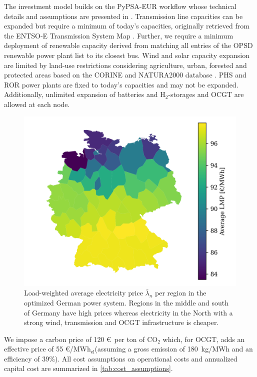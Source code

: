 \documentclass[11pt,twocolumn]{article}
\newcommand{\averagelmp}[1][n]{\bar{\lambda}_{#1}}
\newcommand{\megawatthour}{MWh$_\text{el}$}
\begin{document}
The investment model builds on the PyPSA-EUR workflow \cite{horsch_jonas_pypsa-eur_2020} whose technical details and assumptions are presented in \cite{horsch_pypsa-eur_2018}. Transmission line capacities can be expanded but require a minimum of today's capacities, originally retrieved from the ENTSO-E Transmission System Map \cite{entso-e_entso-e_nodate}. Further, we require a minimum deployment of renewable capacity derived from matching all entries of the OPSD renewable power plant list \cite{schlechtRenewablePowerPlants2020} to its closest bus. Wind and solar capacity expansion are limited by land-use restrictions considering agriculture, urban, forested and protected areas based on the CORINE and NATURA2000 database \cite{eea_corine_2012,eea_natura_2016}. \ac{PHS} and \ac{ROR} power plants are fixed to today's capacities and may not be expanded. Additionally, unlimited expansion of batteries and H$_{2}$-storages and \ac{OCGT} are allowed at each node. 
% 
% 
\begin{figure}
    \centering
    \includegraphics[width=\linewidth]{de50/average_price}
    \caption{Load-weighted average electricity price $\averagelmp$ per region in the optimized German power system. Regions in the middle and south of Germany have high prices whereas electricity in the North with a strong wind, transmission and \ac{OCGT} infrastructure is cheaper.}
    \label{fig:average_price}
\end{figure}
We impose a carbon price of 120 \euro\, per ton of CO$_{2}$ which, for OCGT, adds an effective price of 55 \euro/\megawatthour (assuming a gross emission of 180~kg/MWh and an efficiency of 39\%). All cost assumptions on operational costs and annualized capital cost are summarized in \cref{tab:cost_assumptions}. 
\end{document}
